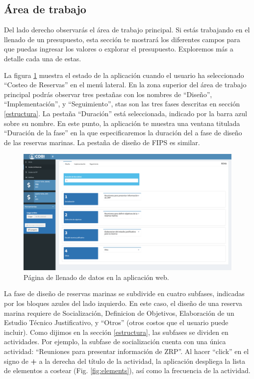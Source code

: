 \documentclass[
]{book}
\begin{document}
\hypertarget{uxe1rea-de-trabajo}{%
\subsection{Área de trabajo}\label{uxe1rea-de-trabajo}}

Del lado derecho observarás el área de trabajo principal. Si estás trabajando en el llenado de un presupuesto, esta sección te mostrará los diferentes campos para que puedas ingresar los valores o explorar el presupuesto. Exploremos más a detalle cada una de estas.

La figura \ref{fig:filling-page} muestra el estado de la aplicación cuando el usuario ha seleccionado ``Costeo de Reservas'' en el menú lateral. En la zona superior del área de trabajo principal podrás observar tres pestañas con los nombres de ``Diseño'', ``Implementación'', y ``Seguimiento'', stas son las tres fases descritas en sección \ref{estructura}. La pestaña ``Duración'' está seleccionada, indicado por la barra azul sobre su nombre. En este punto, la aplicación te muestra una ventana titulada ``Duración de la fase'' en la que especificaremos la duración del a fase de diseño de las reservas marinas. La pestaña de diseño de FIPS es similar.

\begin{figure}
\centering
\includegraphics{images/Screen Shot 2022-07-25 at 2.56.05 PM.png}
\caption{\label{fig:filling-page}Página de llenado de datos en la aplicación web.}
\end{figure}

La fase de diseño de reservas marinas se subdivide en cuatro subfases, indicadas por los bloques azules del lado izquierdo. En este caso, el diseño de una reserva marina requiere de Socialización, Definicion de Objetivos, Elaboración de un Estudio Técnico Justificativo, y ``Otros'' (otros costos que el usuario puede incluir). Como dijimos en la sección \ref{estructura}, las subfases se dividen en actividades. Por ejemplo, la subfase de socialización cuenta con una única actividad: ``Reuniones para presentar información de ZRP''. Al hacer ``click'' en el signo de \textbf{+} a la derecha del título de la actividad, la aplicación despliega la lista de elementos a costear (Fig. \ref{fig:elements}), así como la frecuencia de la actividad.
\end{document}
